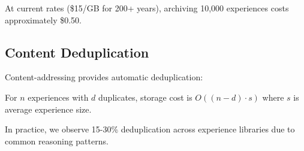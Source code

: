 At current rates (\$15/GB for 200+ years), archiving 10,000 experiences costs approximately \$0.50.

\subsection{Content Deduplication}

Content-addressing provides automatic deduplication:

\begin{theorem}
For $n$ experiences with $d$ duplicates, storage cost is $O((n-d) \cdot s)$ where $s$ is average experience size.
\end{theorem}

In practice, we observe 15-30\% deduplication across experience libraries due to common reasoning patterns.

